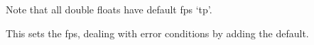 \begin{macro}{\@float}
 \begin{macro}{\@dblflset}

    \begin{teX}
\def\@float#1{%
  \@ifnextchar[%
    {\@xfloat{#1}}%
    {\edef\reserved@a{\noexpand\@xfloat{#1}[\csname fps@#1\endcsname]}%
     \reserved@a}}
    \end{teX}
    
 \end{macro}
 \end{macro}

  \begin{macro}{\@dblfloat}

    \begin{teX}
\def\@dblfloat{%
  \if@twocolumn\let\reserved@a\@dbflt\else\let\reserved@a\@float\fi
  \reserved@a}
    \end{teX}
  \end{macro}

    
  \begin{macro}{\fps@dbl}
  Note that all double floats have default fps `tp'.
  \end{macro}
  
  \begin{macro}{\@setfps}
    This sets the fps, dealing with error conditions by adding
    the default.
    
  \end{macro}

